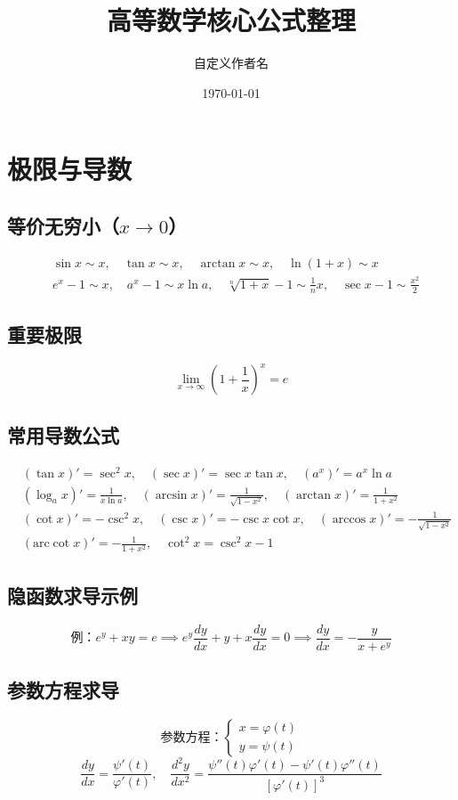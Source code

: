 \documentclass{article}
\title{高等数学核心公式整理}
\author{自定义作者名}
\date{\today}
\begin{document}
\maketitle
\tableofcontents %
\newpage

\section{极限与导数}
\subsection{等价无穷小（$x \to 0$）}
\[
\begin{aligned}
&\sin x \sim x, \quad \tan x \sim x, \quad \arctan x \sim x, \quad \ln(1+x) \sim x \\
&e^x - 1 \sim x, \quad a^x - 1 \sim x\ln a, \quad \sqrt[n]{1+x} - 1 \sim \frac{1}{n}x, \quad \sec x - 1 \sim \frac{x^2}{2}
\end{aligned}
\]

\subsection{重要极限}
\[
\lim_{x \to \infty} \left(1+\frac{1}{x}\right)^x = e
\]

\subsection{常用导数公式}
\[
\begin{aligned}
&(\tan x)' = \sec^2x, \quad (\sec x)' = \sec x\tan x, \quad (a^x)' = a^x\ln a \\
&(\log_a x)' = \frac{1}{x\ln a}, \quad (\arcsin x)' = \frac{1}{\sqrt{1-x^2}}, \quad (\arctan x)' = \frac{1}{1+x^2} \\
&(\cot x)' = -\csc^2x, \quad (\csc x)' = -\csc x\cot x, \quad (\arccos x)' = -\frac{1}{\sqrt{1-x^2}} \\
&(\text{arc}\cot x)' = -\frac{1}{1+x^2}, \quad \cot^2x = \csc^2x - 1
\end{aligned}
\]

\subsection{隐函数求导示例}
\[
\text{例：} e^y + xy = e \implies e^y\frac{dy}{dx} + y + x\frac{dy}{dx} = 0 \implies \frac{dy}{dx} = -\frac{y}{x+e^y}
\]

\subsection{参数方程求导}
\[
\text{参数方程：} \begin{cases} x = \varphi(t) \\ y = \psi(t) \end{cases}
\]
\[
\frac{dy}{dx} = \frac{\psi'(t)}{\varphi'(t)}, \quad \frac{d^2y}{dx^2} = \frac{\psi''(t)\varphi'(t) - \psi'(t)\varphi''(t)}{[\varphi'(t)]^3}
\]
\end{document}
